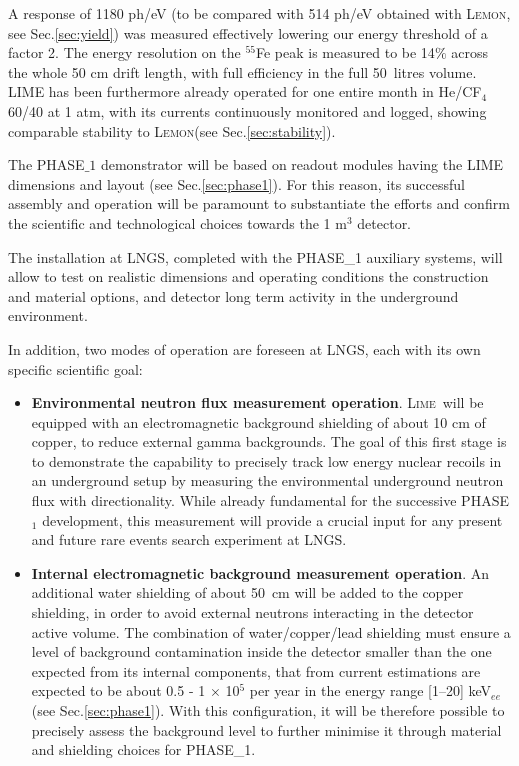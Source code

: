 \documentclass[physics,article,submit,moreauthors,pdftex]{Definitions/mdpi}
\newcommand{\lemon}{{\textsc{Lemon}}\xspace}
\newcommand{\lime}{{\textsc{Lime}}\xspace}
\begin{document}
A response of 1180 ph/eV (to be compared with 514 ph/eV obtained with \lemon, see Sec.\ref{sec:yield}) was measured effectively lowering our energy threshold of a factor 2. The energy resolution on the $^{55}$Fe peak is measured to be 14$\%$ across the whole 50 cm drift length, with full efficiency in the full 50~litres volume. LIME has been furthermore already operated for one entire month in He/CF$_4$ 60/40 at 1 atm, with its currents continuously monitored and logged, showing comparable stability to \lemon (see Sec.\ref{sec:stability}).

The PHASE$\_1$ demonstrator will be based on readout modules having the LIME dimensions and layout (see Sec.\ref{sec:phase1}). For this reason, its successful assembly and operation will be paramount to substantiate the efforts and confirm the scientific and technological choices towards the 1 m$^3$ detector. 

The installation at LNGS, completed with the PHASE\_1 auxiliary systems, will allow to test on realistic dimensions and operating conditions the construction and material options, and detector long term activity in the underground environment. 

In addition, two modes of operation  are foreseen at LNGS, each with its own specific scientific goal:

\begin{itemize}
    \item {\bf Environmental neutron flux measurement operation}. \lime~will be equipped with an electromagnetic background shielding of about 10 cm of copper, to reduce external gamma backgrounds. The goal of this first stage is to demonstrate the capability to precisely track low energy nuclear recoils in an underground setup by measuring the environmental underground neutron flux with directionality. While already  fundamental for the successive PHASE$_1$ development, this measurement will provide a crucial input for any present and future rare events search experiment at LNGS.
    \item {\bf Internal electromagnetic background measurement operation}. An additional water shielding of about 50~cm will be added to the copper shielding, in order to avoid external neutrons interacting in the detector active volume. The combination of water/copper/lead shielding must ensure a level of background contamination inside the detector smaller than the one expected from its internal components, that from current estimations are expected to be about 0.5 - 1 $\times$ 10$^5$ per year in the energy range [1--20] keV$_{ee}$ (see Sec.\ref{sec:phase1}). With this configuration, it will be therefore possible to precisely assess the background level to further minimise it through material and shielding choices for PHASE\_1. 
\end{itemize}
\end{document}

